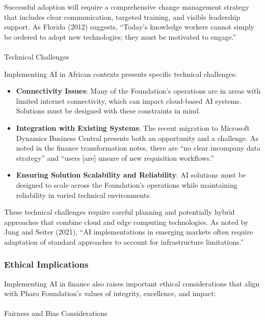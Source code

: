 \documentclass[
]{article}
\makeatletter
\let\oldparagraph\paragraph
\renewcommand{\paragraph}{
    \@ifstar
      \xxxParagraphStar
      \xxxParagraphNoStar
  }
\newcommand{\xxxParagraphStar}[1]{\oldparagraph*{#1}\mbox{}}
\newcommand{\xxxParagraphNoStar}[1]{\oldparagraph{#1}\mbox{}}
\makeatother
\begin{document}
Successful adoption will require a comprehensive change management
strategy that includes clear communication, targeted training, and
visible leadership support. As Florida (2012) suggests, ``Today's
knowledge workers cannot simply be ordered to adopt new technologies;
they must be motivated to engage.''

\paragraph{Technical Challenges}\label{technical-challenges}

Implementing AI in African contexts presents specific technical
challenges:

\begin{itemize}
\item
  \textbf{Connectivity Issues}: Many of the Foundation's operations are
  in areas with limited internet connectivity, which can impact
  cloud-based AI systems. Solutions must be designed with these
  constraints in mind.
\item
  \textbf{Integration with Existing Systems}: The recent migration to
  Microsoft Dynamics Business Central presents both an opportunity and a
  challenge. As noted in the finance transformation notes, there are
  ``no clear incompany data strategy'' and ``users {[}are{]} unsure of
  new requisition workflows.''
\item
  \textbf{Ensuring Solution Scalability and Reliability}: AI solutions
  must be designed to scale across the Foundation's operations while
  maintaining reliability in varied technical environments.
\end{itemize}

These technical challenges require careful planning and potentially
hybrid approaches that combine cloud and edge computing technologies. As
noted by Jung and Seiter (2021), ``AI implementations in emerging
markets often require adaptation of standard approaches to account for
infrastructure limitations.''

\subsubsection{Ethical Implications}\label{ethical-implications}

Implementing AI in finance also raises important ethical considerations
that align with Pharo Foundation's values of integrity, excellence, and
impact:

\paragraph{Fairness and Bias
Considerations}\label{fairness-and-bias-considerations}
\end{document}
